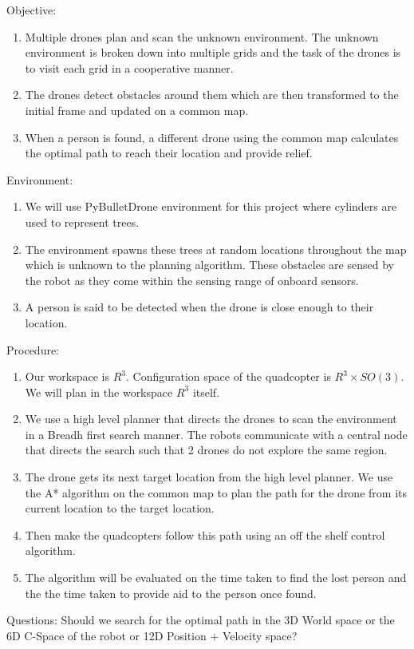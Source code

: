 Objective:
\begin{enumerate}
    \item Multiple drones plan and scan the unknown environment. The unknown environment is broken down into multiple grids and the task of the drones is to visit each grid in a cooperative manner.
    \item The drones detect obstacles around them which are then transformed to the initial frame and updated on a common map.
    \item When a person is found, a different drone using the common map calculates the optimal path to reach their location and provide relief.
\end{enumerate}
Environment:
\begin{enumerate}
    \item We will use PyBulletDrone environment for this project where cylinders are used to represent trees.
    \item The environment spawns these trees at random locations throughout the map which is unknown to the planning algorithm. These obstacles are sensed by the robot as they come within the sensing range of onboard sensors.
    \item A person is said to be detected when the drone is close enough to their location.
\end{enumerate}
Procedure:
\begin{enumerate}
    \item Our workspace is \(R^3\). Configuration space of the quadcopter is \(R^3 \times SO(3)\). We will plan in the workspace \(R^3\) itself.
    \item We use a high level planner that directs the drones to scan the environment in a Breadh first search manner. The robots communicate with a central node that directs the search such that 2 drones do not explore the same region.
    \item The drone gets its next target location from the high level planner. We use the A* algorithm on the common map to plan the path for the drone from its current location to the target location.
    \item Then make the quadcopters follow this path using an off the shelf control algorithm.
    \item The algorithm will be evaluated on the time taken to find the lost person and the the time taken to provide aid to the person once found.
\end{enumerate}

Questions: Should we search for the optimal path in the 3D World space or the 6D C-Space of the robot or 12D Position + Velocity space?
